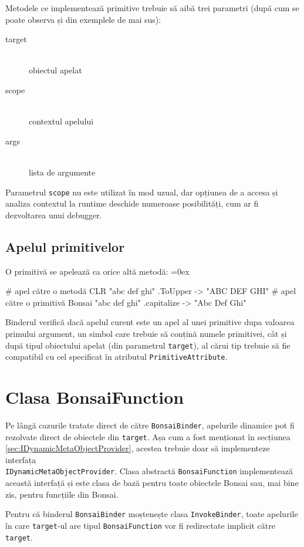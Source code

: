 \documentclass[12pt,a4paper]{memoir}
\renewcommand{\c}{\texttt}
\newenvironment{code}
{
\definecolor{shadecolor}{gray}{0.91}
\topsep=0ex
\relax
\shaded
\verbatim
}
{
\endverbatim
\endshaded
}
\begin{document}
Metodele ce implementează primitive trebuie să aibă trei parametri (după cum se poate observa și din exemplele de mai sus):
\begin{description}
\item[target]\hfill\\ obiectul apelat
\item[scope]\hfill\\ contextul apelului
\item[args]\hfill\\ lista de argumente
\end{description}

Parametrul \c{scope} nu este utilizat în mod uzual, dar opțiunea de a accesa și analiza contextul la runtime deschide numeroase posibilități, cum ar fi dezvoltarea unui debugger.

\subsection{Apelul primitivelor}

O primitivă se apelează ca orice altă metodă:
\begin{code}
# apel către o metodă CLR
"abc def ghi" .ToUpper
  -> "ABC DEF GHI"
# apel către o primitivă Bonsai
"abc def ghi" .capitalize
  -> "Abc Def Ghi"
\end{code}

Binderul verifică dacă apelul curent este un apel al unei primitive dupa valoarea primului argument, un simbol care trebuie să conțină numele primitivei, cât și după tipul obiectului apelat (din parametrul \c{target}), al cărui tip trebuie să fie compatibil cu cel specificat în atributul \c{PrimitiveAttribute}.

\section{Clasa BonsaiFunction}

Pe lângă cazurile tratate direct de către \c{BonsaiBinder}, apelurile dinamice pot fi rezolvate direct de obiectele din \c{target}. Așa cum a fost menționat în secțiunea \ref{sec:IDynamicMetaObjectProvider}, acestea trebuie doar să implementeze interfața\\ \c{IDynamicMetaObjectProvider}. Clasa abstractă \c{BonsaiFunction} implementează această interfață și este clasa de bază pentru toate obiectele Bonsai sau, mai bine zis, pentru funcțiile din Bonsai.

Pentru că binderul \c{BonsaiBinder} moștenește clasa \c{InvokeBinder}, toate apelurile în care \c{target}-ul are tipul \c{BonsaiFunction} vor fi redirectate implicit către \c{target}.
\end{document}
